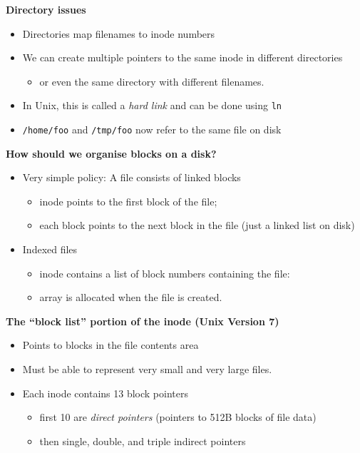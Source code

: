 \documentclass[11pt,a4paper]{article}
\begin{document}
\textbf{Directory issues}
\begin{itemize}
    \item Directories map filenames to inode numbers
    \item We can create multiple pointers to the same inode in different directories
        \begin{itemize}
            \item or even the same directory with different filenames.
        \end{itemize}
    \item In Unix, this is called a \emph{hard link} and can be done using \texttt{ln}
    \item \texttt{/home/foo} and \texttt{/tmp/foo} now refer to the same file on disk
\end{itemize}

\textbf{How should we organise blocks on a disk?}
\begin{itemize}
    \item Very simple policy: A file consists of linked blocks
        \begin{itemize}
            \item inode points to the first block of the file;
            \item each block points to the next block in the file (just a linked list on  disk)
        \end{itemize}
    \item Indexed files
        \begin{itemize}
            \item inode contains a list of block numbers containing the file:
            \item array is allocated when the file is created.
        \end{itemize}
\end{itemize}

\textbf{The ``block list'' portion of the inode (Unix Version 7)}
\begin{itemize}
    \item Points to blocks in the file contents area
    \item Must be able to represent very small and very large files.
    \item Each inode contains 13 block pointers
        \begin{itemize}
            \item first 10 are \emph{direct pointers} (pointers to 512B blocks of file data)
            \item then single, double, and triple indirect pointers
        \end{itemize}
\end{itemize}
\end{document}
